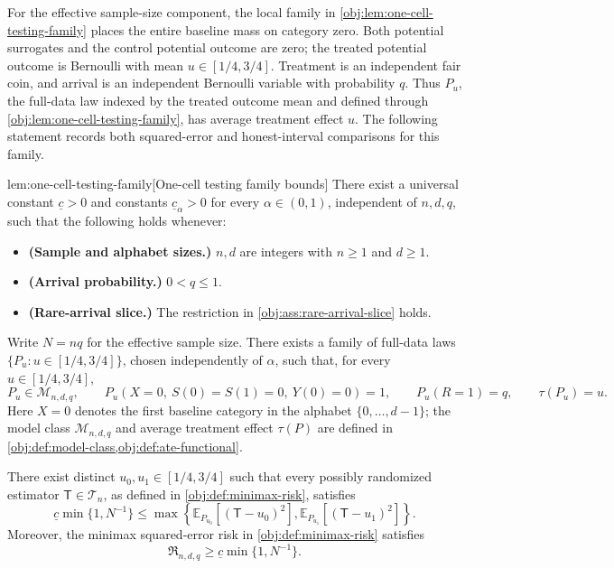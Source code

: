 For the effective sample-size component, the local family in \cref{obj:lem:one-cell-testing-family} places the entire baseline mass on category zero. Both potential surrogates and the control potential outcome are zero; the treated potential outcome is Bernoulli with mean \(u\in[1/4,3/4]\). Treatment is an independent fair coin, and arrival is an independent Bernoulli variable with probability \(q\). Thus \(P_u\), the full-data law indexed by the treated outcome mean and defined through \cref{obj:lem:one-cell-testing-family}, has average treatment effect \(u\). The following statement records both squared-error and honest-interval comparisons for this family.

\begin{lemmav}{lem:one-cell-testing-family}[One-cell testing family bounds]
There exist a universal constant \(\underline c>0\) and constants \(\underline c_\alpha>0\) for every \(\alpha\in(0,1)\), independent of \(n,d,q\), such that the following holds whenever:
\begin{itemize}
\item \textbf{(Sample and alphabet sizes.)} \(n,d\) are integers with \(n\ge1\) and \(d\ge1\).
\item \textbf{(Arrival probability.)} \(0<q\le1\).
\item \textbf{(Rare-arrival slice.)} The restriction in \cref{obj:ass:rare-arrival-slice} holds.
\end{itemize}
Write \(N=nq\) for the effective sample size. There exists a family of full-data laws \(\{P_u:u\in[1/4,3/4]\}\), chosen independently of \(\alpha\), such that, for every \(u\in[1/4,3/4]\),
\[
P_u\in\mathcal M_{n,d,q},\qquad
P_u\!\left(X=0,\ S(0)=S(1)=0,\ Y(0)=0\right)=1,
\qquad
P_u(R=1)=q,\qquad
\tau(P_u)=u.
\]
Here \(X=0\) denotes the first baseline category in the alphabet \(\{0,\ldots,d-1\}\); the model class \(\mathcal M_{n,d,q}\) and average treatment effect \(\tau(P)\) are defined in \cref{obj:def:model-class,obj:def:ate-functional}.

There exist distinct \(u_0,u_1\in[1/4,3/4]\) such that every possibly randomized estimator \(\mathsf T\in\mathcal T_n\), as defined in \cref{obj:def:minimax-risk}, satisfies
\[
\underline c\min\{1,N^{-1}\}
\le
\max\left\{
\mathbb E_{P_{u_0}}\!\left[(\mathsf T-u_0)^2\right],
\mathbb E_{P_{u_1}}\!\left[(\mathsf T-u_1)^2\right]
\right\}.
\]
Moreover, the minimax squared-error risk in \cref{obj:def:minimax-risk} satisfies
\[
\mathfrak R_{n,d,q}\ge
\underline c\min\{1,N^{-1}\}.
\]


\end{lemmav}
